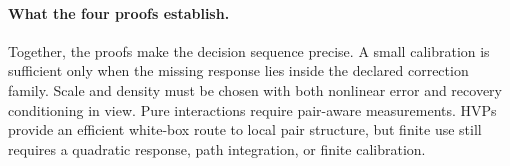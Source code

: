 \documentclass[sigconf,10pt,nonacm,balance=false]{acmart}
\begin{document}
\paragraph{What the four proofs establish.}
Together, the proofs make the decision sequence precise. A small calibration is sufficient only when the missing response lies inside the declared correction family. Scale and density must be chosen with both nonlinear error and recovery conditioning in view. Pure interactions require pair-aware measurements. HVPs provide an efficient white-box route to local pair structure, but finite use still requires a quadratic response, path integration, or finite calibration.




\end{document}
